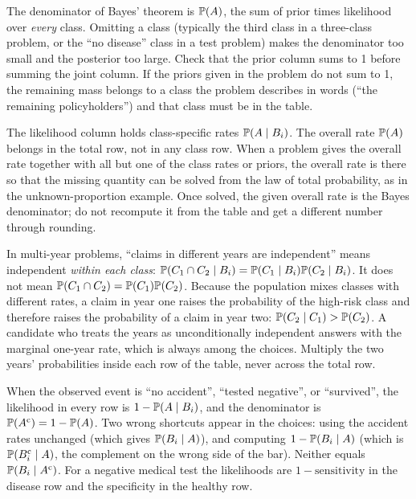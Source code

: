 \begin{trap}
The denominator of Bayes' theorem is $\mathbb{P}(A)$, the sum of prior times likelihood over
\emph{every} class. Omitting a class (typically the third class in a three-class problem, or
the ``no disease'' class in a test problem) makes the denominator too small and the posterior
too large. Check that the prior column sums to 1 before summing the joint column. If the
priors given in the problem do not sum to 1, the remaining mass belongs to a class the
problem describes in words (``the remaining policyholders'') and that class must be in the
table.
\end{trap}

\begin{trap}
The likelihood column holds class-specific rates $\mathbb{P}(A \mid B_i)$. The overall rate
$\mathbb{P}(A)$ belongs in the total row, not in any class row. When a problem gives the overall
rate together with all but one of the class rates or priors, the overall rate is there so
that the missing quantity can be solved from the law of total probability, as in the
unknown-proportion example. Once solved, the given overall rate is the Bayes denominator; do
not recompute it from the table and get a different number through rounding.
\end{trap}

\begin{trap}
In multi-year problems, ``claims in different years are independent'' means independent
\emph{within each class}: $\mathbb{P}(C_1 \cap C_2 \mid B_i) = \mathbb{P}(C_1 \mid B_i)\mathbb{P}(C_2 \mid B_i)$.
It does not mean $\mathbb{P}(C_1 \cap C_2) = \mathbb{P}(C_1)\mathbb{P}(C_2)$. Because the population mixes
classes with different rates, a claim in year one raises the probability of the high-risk
class and therefore raises the probability of a claim in year two:
$\mathbb{P}(C_2 \mid C_1) > \mathbb{P}(C_2)$. A candidate who treats the years as unconditionally
independent answers with the marginal one-year rate, which is always among the choices.
Multiply the two years' probabilities inside each row of the table, never across the total
row.
\end{trap}

\begin{trap}
When the observed event is ``no accident'', ``tested negative'', or ``survived'', the
likelihood in every row is $1 - \mathbb{P}(A \mid B_i)$, and the denominator is
$\mathbb{P}(A^{\mathrm{c}}) = 1 - \mathbb{P}(A)$. Two wrong shortcuts appear in the choices:
using the accident rates unchanged (which gives $\mathbb{P}(B_i \mid A)$), and computing
$1 - \mathbb{P}(B_i \mid A)$ (which is $\mathbb{P}(B_i^{\mathrm{c}} \mid A)$, the complement on the wrong
side of the bar). Neither equals $\mathbb{P}(B_i \mid A^{\mathrm{c}})$. For a negative medical test the
likelihoods are $1 - \text{sensitivity}$ in the disease row and the specificity in the
healthy row.
\end{trap}

